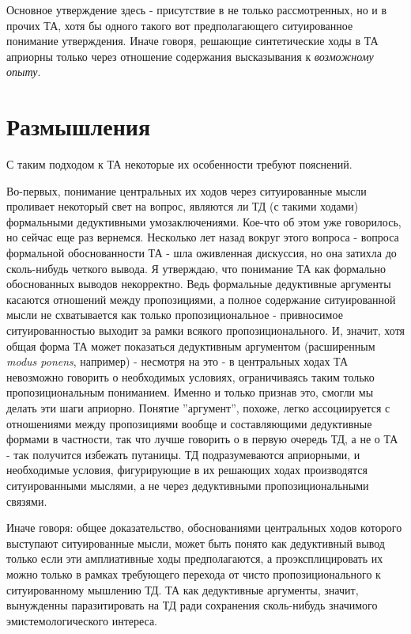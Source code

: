 \documentclass{article}
\begin{document}
Основное утверждение здесь - присутствие в не только рассмотренных, но и в прочих ТА, хотя бы одного такого вот предполагающего ситуированное понимание утверждения. Иначе говоря, решающие синтетические ходы в ТА априорны только через отношение содержания высказывания к \textit{возможному опыту}.

\section{Размышления}

С таким подходом к ТА некоторые их особенности требуют пояснений.

Во-первых, понимание центральных их ходов через ситуированные мысли проливает некоторый свет на вопрос, являются ли ТД (с такими ходами) формальными дедуктивными умозаключениями. Кое-что об этом уже говорилось, но сейчас еще раз вернемся. Несколько лет назад вокруг этого вопроса - вопроса формальной обоснованности ТА - шла оживленная дискуссия, но она затихла до сколь-нибудь четкого вывода. Я утверждаю, что понимание ТА как формально обоснованных выводов некорректно. Ведь формальные дедуктивные аргументы касаются отношений между пропозициями, а полное содержание ситуированной мысли не схватывается как только пропозициональное - привносимое ситуированностью выходит за рамки всякого пропозиционального. И, значит, хотя общая форма ТА может показаться дедуктивным аргументом (расширенным \textit{modus ponens}, например) - несмотря на это - в центральных ходах ТА невозможно говорить о необходимых условиях, ограничиваясь таким только пропозициональным пониманием. Именно и только признав это, смогли мы делать эти шаги априорно. Понятие ''аргумент'', похоже, легко ассоциируется с отношениями между пропозициями вообще и составляющими дедуктивные формами в частности, так что лучше говорить о в первую очередь ТД, а не о ТА - так получится избежать путаницы. ТД подразумеваются априорными, и необходимые условия, фигурирующие в их решающих ходах производятся ситуированными мыслями, а не через дедуктивными пропозициональными связями.

Иначе говоря: общее доказательство, обоснованиями центральных ходов которого выступают ситуированные мысли, может быть понято как дедуктивный вывод только если эти амплиативные ходы предполагаются, а проэксплицировать их можно только в рамках требующего перехода от чисто пропозиционального к ситуированному мышлению ТД. ТА как дедуктивные аргументы, значит, вынужденны паразитировать на ТД ради сохранения сколь-нибудь значимого эмистемологического интереса.
\end{document}
